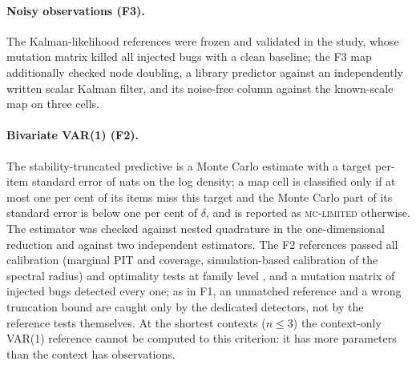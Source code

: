 \paragraph{Noisy observations (F3).} The Kalman-likelihood references were frozen and validated in the \sSix study, whose
mutation matrix killed all \SsixMutations injected bugs with a clean baseline; the F3 map additionally checked node
doubling, a library predictor against an independently written scalar Kalman filter, and its noise-free column against the
known-scale map on three cells.

\paragraph{Bivariate VAR(1) (F2).} The stability-truncated predictive is a Monte Carlo estimate with a target per-item
standard error of \ItemSETarget nats on the log density; a map cell is classified only if at most one per cent of its items
miss this target and the Monte Carlo part of its standard error is below one per cent of $\delta$, and is reported as
\textsc{mc-limited} otherwise. The estimator was checked against nested quadrature in the one-dimensional reduction and
against two independent estimators. The F2 references passed all \FtwoValTests calibration (marginal PIT and coverage,
simulation-based calibration of the spectral radius) and optimality tests at family level \FamilyAlpha, and a mutation
matrix of \FtwoMutations injected bugs detected every one; as in F1, an unmatched reference and a wrong truncation bound are
caught only by the dedicated detectors, not by the reference tests themselves. At the shortest contexts ($n\le 3$) the
context-only VAR(1) reference cannot be computed to this criterion: it has more parameters than the context has
observations.
